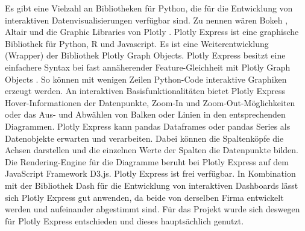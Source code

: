     
    Es gibt eine Vielzahl an Bibliotheken für Python, die für die Entwicklung von interaktiven Datenvisualisierungen verfügbar sind. Zu
    nennen wären Bokeh \cite[vgl.][]{van_de_ven_bokeh_2021}, Altair \cite[vgl.][]{altair_altair_2021} und die 
    Graphic Libraries von Plotly \cite[vgl.][]{plotly_plotly_2021}.
    Plotly Express ist eine graphische Bibliothek für Python, \textsf{R} und Javascript. Es ist eine Weiterentwicklung (Wrapper) der Bibliothek Plotly Graph Objects. 
    Plotly Express besitzt eine einfachere Syntax bei fast annäherender Feature-Gleichheit mit Plotly Graph Objects \cite[vgl.][]{plotly_plotly_2021}.
    So können mit wenigen Zeilen Python-Code interaktive Graphiken erzeugt werden. 
    An interaktiven Basisfunktionalitäten bietet Plotly Express Hover-Informationen der Datenpunkte, Zoom-In und Zoom-Out-Möglichkeiten oder
    das Aus- und Abwählen von Balken oder Linien in den entsprechenden Diagrammen. Plotly Express kann pandas Dataframes 
    oder pandas Series als Datenobjekte erwarten und verarbeiten. Dabei können die Spaltenköpfe die Achsen darstellen 
    und die einzelnen Werte der Spalten die Datenpunkte bilden. Die Rendering-Engine für die Diagramme beruht bei Plotly Express auf dem JavaScript Framework D3.js. 
    Plotly Express ist frei verfügbar. In Kombination mit der Bibliothek Dash für die Entwicklung von interaktiven Dashboards lässt sich Plotly Express gut anwenden, 
    da beide von derselben Firma entwickelt werden und aufeinander abgestimmt sind. Für das Projekt wurde sich deswegen für Plotly Express entschieden 
    und dieses hauptsächlich genutzt. 
    
